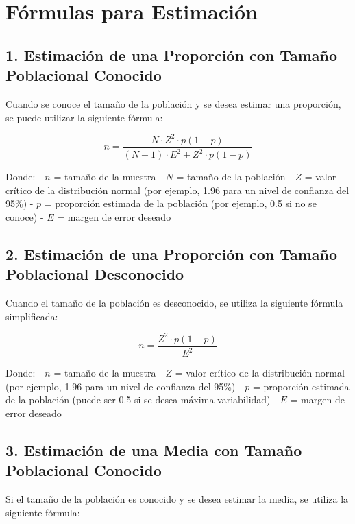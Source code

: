 \documentclass[
  letterpaper,
  DIV=11,
  numbers=noendperiod]{scrreprt}
\begin{document}
\chapter{Fórmulas para Estimación}\label{fuxf3rmulas-para-estimaciuxf3n}

\section{1. Estimación de una Proporción con Tamaño Poblacional
Conocido}\label{estimaciuxf3n-de-una-proporciuxf3n-con-tamauxf1o-poblacional-conocido}

Cuando se conoce el tamaño de la población y se desea estimar una
proporción, se puede utilizar la siguiente fórmula:

\[n = \frac{N \cdot Z^2 \cdot p(1 - p)}{(N - 1) \cdot E^2 + Z^2 \cdot p(1 - p)}\]

Donde: - \(n\) = tamaño de la muestra - \(N\) = tamaño de la población -
\(Z\) = valor crítico de la distribución normal (por ejemplo, 1.96 para
un nivel de confianza del 95\%) - \(p\) = proporción estimada de la
población (por ejemplo, 0.5 si no se conoce) - \(E\) = margen de error
deseado

\section{2. Estimación de una Proporción con Tamaño Poblacional
Desconocido}\label{estimaciuxf3n-de-una-proporciuxf3n-con-tamauxf1o-poblacional-desconocido}

Cuando el tamaño de la población es desconocido, se utiliza la siguiente
fórmula simplificada:

\[n = \frac{Z^2 \cdot p(1 - p)}{E^2}\]

Donde: - \(n\) = tamaño de la muestra - \(Z\) = valor crítico de la
distribución normal (por ejemplo, 1.96 para un nivel de confianza del
95\%) - \(p\) = proporción estimada de la población (puede ser 0.5 si se
desea máxima variabilidad) - \(E\) = margen de error deseado

\section{3. Estimación de una Media con Tamaño Poblacional
Conocido}\label{estimaciuxf3n-de-una-media-con-tamauxf1o-poblacional-conocido}

Si el tamaño de la población es conocido y se desea estimar la media, se
utiliza la siguiente fórmula:
\end{document}

